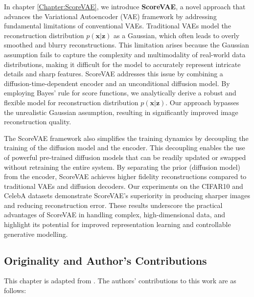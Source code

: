 In chapter \ref{Chapter:ScoreVAE}, we introduce \textbf{ScoreVAE}, a novel approach that advances the Variational Autoencoder (VAE) framework by addressing fundamental limitations of conventional VAEs. Traditional VAEs model the reconstruction distribution $p(\mathbf{x}|\mathbf{z})$ as a Gaussian, which often leads to overly smoothed and blurry reconstructions. This limitation arises because the Gaussian assumption fails to capture the complexity and multimodality of real-world data distributions, making it difficult for the model to accurately represent intricate details and sharp features. ScoreVAE addresses this issue by combining a diffusion-time-dependent encoder and an unconditional diffusion model. By employing Bayes' rule for score functions, we analytically derive a robust and flexible model for reconstruction distribution $p(\mathbf{x}|\mathbf{z})$. Our approach bypasses the unrealistic Gaussian assumption, resulting in significantly improved image reconstruction quality.

The ScoreVAE framework also simplifies the training dynamics by decoupling the training of the diffusion model and the encoder. This decoupling enables the use of powerful pre-trained diffusion models that can be readily updated or swapped without retraining the entire system. By separating the prior (diffusion model) from the encoder, ScoreVAE achieves higher fidelity reconstructions compared to traditional VAEs and diffusion decoders. Our experiments on the CIFAR10 and CelebA datasets demonstrate ScoreVAE’s superiority in producing sharper images and reducing reconstruction error. These results underscore the practical advantages of ScoreVAE in handling complex, high-dimensional data, and highlight its potential for improved representation learning and controllable generative modelling.

\subsection*{Originality and Author’s Contributions}

This chapter is adapted from \cite{batzolis2023variational}. The authors' contributions to this work are as follows:

